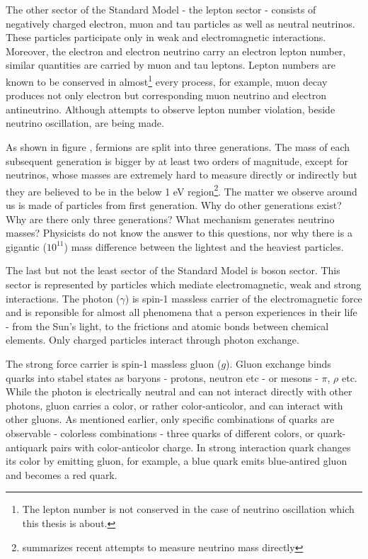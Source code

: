 The other sector of the Standard Model - the lepton sector - consists of negatively charged electron,
muon and tau particles as well as neutral neutrinos. These particles participate only in
weak and electromagnetic interactions. Moreover, the electron and electron neutrino carry an electron 
lepton number, similar quantities are carried by muon and tau leptons. Lepton numbers are known to be 
conserved in almost\footnote{The lepton number is not conserved in the case of neutrino oscillation which
this thesis is about.} every process, for example, muon decay produces not only electron but corresponding muon 
neutrino and electron antineutrino. Although attempts to observe lepton number violation, beside neutrino
oscillation, are being made.

As shown in figure , fermions are split into three generations. The mass of each 
subsequent generation is bigger by at least two orders of magnitude, except for neutrinos, whose 
masses are extremely hard to measure directly or indirectly but they are believed to be 
in the below 1 eV region\footnote{\cite{numass} summarizes recent attempts to measure neutrino mass directly}. 
The matter we observe around us is made of particles from first generation. Why do other generations exist? 
Why are there only three generations? What mechanism generates neutrino masses? Physicists do not know the answer 
to this questions, nor why there is a gigantic ($10^{11}$) mass difference between the lightest and the 
heaviest particles.

The last but not the least sector of the Standard Model is boson sector. This sector is 
represented by particles which mediate electromagnetic, weak and strong interactions. The photon
($\gamma$) is spin-1 massless carrier of the electromagnetic force and is reponsible for almost all phenomena 
that a person experiences in their life - from the Sun's light, to the frictions and atomic bonds between 
chemical elements. Only charged particles interact through photon exchange.

The strong force carrier is spin-1 massless gluon ($g$). Gluon exchange binds quarks into stabel states as
baryons - protons, neutron etc - or mesons - $\pi$, $\rho$ etc. While the photon is electrically
neutral and can not interact directly with other photons, gluon carries a color, or
rather color-anticolor, and can interact with other gluons. As mentioned earlier, only specific 
combinations of quarks are observable - colorless combinations - three quarks of different colors,
or quark-antiquark pairs with color-anticolor charge. In strong interaction quark changes its color
by emitting gluon, for example, a blue quark emits blue-antired gluon and becomes a red quark.

